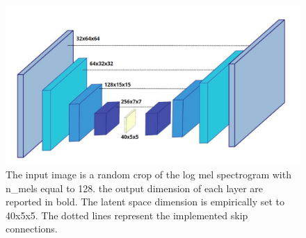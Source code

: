 \documentclass{article}
\begin{document}
\begin{itemize}
 \begin{figure}
    \centering
    \includegraphics[width=.7\linewidth]{assets/cnnAE.png}
    \caption{ The input image is a random crop of the log mel spectrogram with n\_mels equal to 128.  the output dimension of each layer are reported in bold. The latent space dimension is empirically set to 40x5x5. The dotted lines represent the implemented skip connections.}
    \label{fig:cnnAE}
\end{figure}
\end{itemize}

%			
%			
\end{document}
